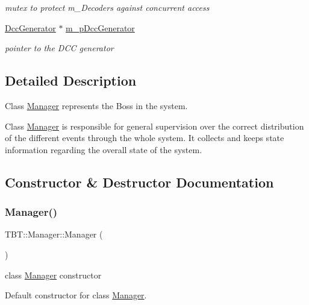 \begin{DoxyCompactItemize}
\begin{DoxyCompactList}\small\item\em mutex to protect m\+\_\+\+Decoders against concurrent access \end{DoxyCompactList}\item 
\hyperlink{classTBT_1_1DccGenerator}{Dcc\+Generator} $\ast$ \hyperlink{classTBT_1_1Manager_ad070372930d6b26a933f9a087666beff_ad070372930d6b26a933f9a087666beff}{m\+\_\+p\+Dcc\+Generator}
\begin{DoxyCompactList}\small\item\em pointer to the D\+CC generator \end{DoxyCompactList}\end{DoxyCompactItemize}


\subsection{Detailed Description}
Class \hyperlink{classTBT_1_1Manager}{Manager} represents \textquotesingle{}the Boss\textquotesingle{} in the system. 

Class \hyperlink{classTBT_1_1Manager}{Manager} is responsible for general supervision over the correct distribution of the different events through the whole system. It collects and keeps state information regarding the overall state of the system. 

\subsection{Constructor \& Destructor Documentation}
\mbox{\label{classTBT_1_1Manager_a9e6016c4b93e9fff6338c5413d1a1f78_a9e6016c4b93e9fff6338c5413d1a1f78}} 
\subsubsection{\texorpdfstring{Manager()}{Manager()}}
{\footnotesize\ttfamily T\+B\+T\+::\+Manager\+::\+Manager (\begin{DoxyParamCaption}{ }\end{DoxyParamCaption})}



class \hyperlink{classTBT_1_1Manager}{Manager} constructor 

Default constructor for class \hyperlink{classTBT_1_1Manager}{Manager}.

